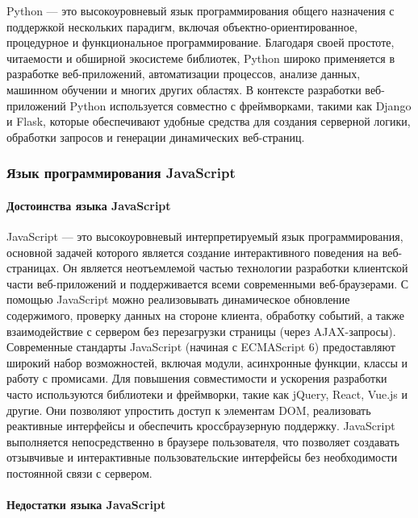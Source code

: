Python — это высокоуровневый язык программирования общего назначения с поддержкой нескольких парадигм, включая объектно-ориентированное, процедурное и функциональное программирование. Благодаря своей простоте, читаемости и обширной экосистеме библиотек, Python широко применяется в разработке веб-приложений, автоматизации процессов, анализе данных, машинном обучении и многих других областях. В контексте разработки веб-приложений Python используется совместно с фреймворками, такими как Django и Flask, которые обеспечивают удобные средства для создания серверной логики, обработки запросов и генерации динамических веб-страниц.

\subsubsection{Язык программирования JavaScript}

\paragraph{Достоинства языка JavaScript}

JavaScript — это высокоуровневый интерпретируемый язык программирования, основной задачей которого является создание интерактивного поведения на веб-страницах. Он является неотъемлемой частью технологии разработки клиентской части веб-приложений и поддерживается всеми современными веб-браузерами. С помощью JavaScript можно реализовывать динамическое обновление содержимого, проверку данных на стороне клиента, обработку событий, а также взаимодействие с сервером без перезагрузки страницы (через AJAX-запросы). Современные стандарты JavaScript (начиная с ECMAScript 6) предоставляют широкий набор возможностей, включая модули, асинхронные функции, классы и работу с промисами. Для повышения совместимости и ускорения разработки часто используются библиотеки и фреймворки, такие как jQuery, React, Vue.js и другие. Они позволяют упростить доступ к элементам DOM, реализовать реактивные интерфейсы и обеспечить кроссбраузерную поддержку. JavaScript выполняется непосредственно в браузере пользователя, что позволяет создавать отзывчивые и интерактивные пользовательские интерфейсы без необходимости постоянной связи с сервером.

\paragraph{Недостатки языка JavaScript}

